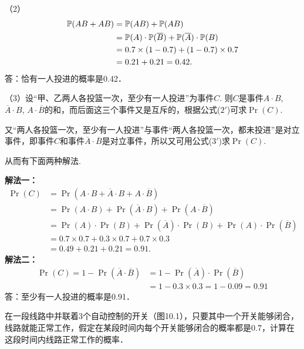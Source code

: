 \begin{solution}
（2）
\[\begin{split}
    \mathbb{P}(AB+AB)&=\mathbb{P}(AB)+\mathbb{P}(AB)\\
&=\mathbb{P}(A)\cdot \mathbb{P}(\overline{B})+\mathbb{P}(\overline{A})\cdot \mathbb{P}(B)\\
&=0.7\times(1-0.7)+(1-0.7)\times0.7\\
&=0.21+0.21=0.42.    
\end{split}\]
答：恰有一人投进的概率是0.42．
\end{solution}

\begin{analyze}
（3）设“甲、乙两人各投篮一次，至少有一人投进”为事件$C$. 则$C$是事件$A\cdot B$, $\overline{A}\cdot B$, $A\cdot \overline{B}$的和，而后面这三个事件又是互斥的，根据公式($2'$)可求$\Pr(C)$.

又“两人各投篮一次，至少有一人投进”与事件“两人各投篮一次，都未投进”是对立事件，即事件$C$和事件$\overline{A}\cdot \overline{B}$是对立事件，所以又可用公式($3'$)求$\Pr(C)$.

从而有下面两种解法.    
\end{analyze}

\begin{solution}
\textbf{解法一：}\[\begin{split}
    \Pr(C)&=\Pr(A\cdot  B+\overline{A}\cdot B+A\cdot\overline{B})\\
    &=\Pr(A\cdot B)+\Pr(\overline{A}\cdot B)+\Pr(A\cdot \overline{B})\\
    &=\Pr(A)\cdot \Pr(B)+\Pr(\overline{A})\cdot \Pr(B)+\Pr(A)\cdot \Pr(\overline{B})\\
&=0.7\times0.7+0.3\times0.7+0.7\times0.3\\
&=0.49+0.21+0.21 =0.91.
\end{split}\]
\textbf{解法二：}
\[\begin{split}
    \Pr(C)=1-\Pr(\overline{A}\cdot\overline{B})
    &=1-\Pr(\overline{A})\cdot \Pr(\overline{B})\\
    &=1-0.3\times0.3=1-0.09=0.91
\end{split}\]
答：至少有一人投进的概率是0.91．
\end{solution}

\begin{example}
    在一段线路中并联着3个自动控制的开关（图10.1），只要其中一个开关能够闭合，线路就能正常工作，假定在某段时间内每个开关能够闭合的概率都是0.7，计算在这段时间内线路正常工作的概率．
\end{example}

